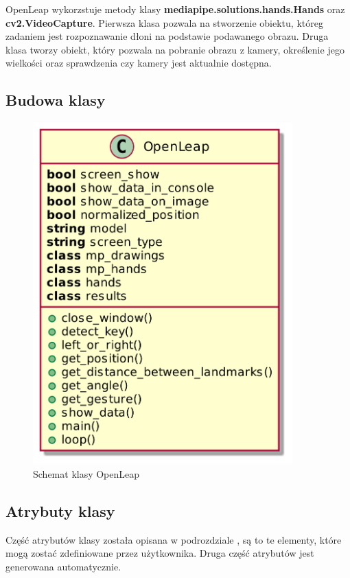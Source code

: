\quad OpenLeap wykorzstuje metody klasy \textbf{mediapipe.solutions.hands.Hands} oraz \textbf{cv2.VideoCapture}. Pierwsza klasa pozwala na stworzenie obiektu, któreg zadaniem jest rozpoznawanie dłoni na podstawie podawanego obrazu. Druga klasa tworzy obiekt, który pozwala na pobranie obrazu z kamery, określenie jego wielkości oraz sprawdzenia czy kamery jest aktualnie dostępna. 

\subsection{Budowa klasy}

\quad 

\begin{figure}[H]
    \begin{center}
        \includegraphics[width=10cm]{../images/class.png}
        \caption{Schemat klasy OpenLeap} 
    \end{center}
\end{figure}

\subsection{Atrybuty klasy}

\quad Część atrybutów klasy została opisana w podrozdziale \textbf{}, są to te elementy, które mogą zostać zdefiniowane przez użytkownika. Druga część atrybutów jest generowana automatycznie. 


